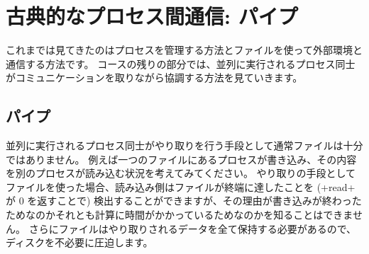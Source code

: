 %
%

\chapter{\label{sec/pipes}古典的なプロセス間通信: パイプ}


これまでは見てきたのはプロセスを管理する方法とファイルを使って外部環境と通信する方法です。
コースの残りの部分では、並列に実行されるプロセス同士がコミュニケーションを取りながら協調する方法を見ていきます。

\section{パイプ}

並列に実行されるプロセス同士がやり取りを行う手段として通常ファイルは十分ではありません。
例えば一つのファイルにあるプロセスが書き込み、その内容を別のプロセスが読み込む状況を考えてみてください。
やり取りの手段としてファイルを使った場合、読み込み側はファイルが終端に達したことを (\ml+read+ が 0 を返すことで)
検出することができますが、その理由が書き込みが終わったためなのかそれとも計算に時間がかかっているためなのかを知ることはできません。
さらにファイルはやり取りされるデータを全て保持する必要があるので、ディスクを不必要に圧迫します。

